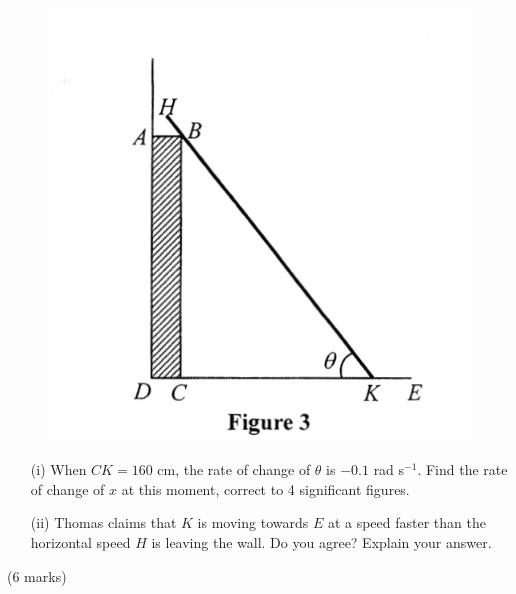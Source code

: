 \documentclass[12pt]{article}
\begin{document}
\begin{enumerate}
\begin{enumerate}
		\begin{figure}[H]
			\centering
			\includegraphics[width = .5\linewidth]{2014Figure3}
		\end{figure}
		\begin{enumerate}
			\item [(i)]When $CK = 160$ cm, the rate of change of $\theta$ is $-0.1$ rad s$^{-1}$. Find the rate of change of $x$ at this moment, correct to 4 significant figures. 
			\item [(ii)]Thomas claims that $K$ is moving towards $E$ at a speed faster than the horizontal speed $H$ is leaving the wall. Do you agree? Explain your answer.
		\end{enumerate}
		(6 marks)
	\end{enumerate}


\end{enumerate}
\end{document}
